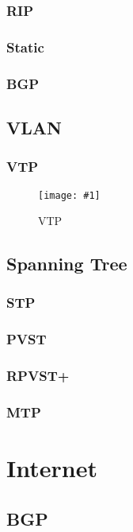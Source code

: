 \documentclass[a4paper,12pt,twoside]{book}
\newcommand{\rfig}[2]{
\begin{wrapfigure}{r}{0.60\textwidth}
    \begin{center}
        \texttt{[image: \#1]}
    \end{center}
    \caption{#2}
\end{wrapfigure}
}
\begin{document}
\subsection{RIP}
\subsection{Static}
\subsection{BGP}

\section{VLAN}

\subsection{VTP}
\rfig{vtp/implementing-vtp}{VTP}\cite{vtpchap4}


\section{Spanning Tree}

\subsection{STP}
\subsection{PVST}
\subsection{RPVST+}
\subsection{MTP}



\chapter{Internet}

\section{BGP}
\end{document}
